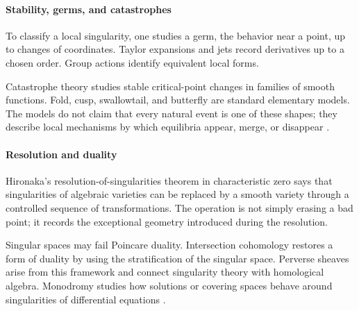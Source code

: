 \paragraph{Stability, germs, and catastrophes}
To classify a local singularity, one studies a germ, the behavior near a point, up to changes of coordinates. Taylor expansions and jets record derivatives up to a chosen order. Group actions identify equivalent local forms.

Catastrophe theory studies stable critical-point changes in families of smooth functions. Fold, cusp, swallowtail, and butterfly are standard elementary models. The models do not claim that every natural event is one of these shapes; they describe local mechanisms by which equilibria appear, merge, or disappear \cite{singularity_ref1}.

\paragraph{Resolution and duality}
Hironaka's resolution-of-singularities theorem in characteristic zero says that singularities of algebraic varieties can be replaced by a smooth variety through a controlled sequence of transformations. The operation is not simply erasing a bad point; it records the exceptional geometry introduced during the resolution.

Singular spaces may fail Poincare duality. Intersection cohomology restores a form of duality by using the stratification of the singular space. Perverse sheaves arise from this framework and connect singularity theory with homological algebra. Monodromy studies how solutions or covering spaces behave around singularities of differential equations \cite{singularity_ref4}.

